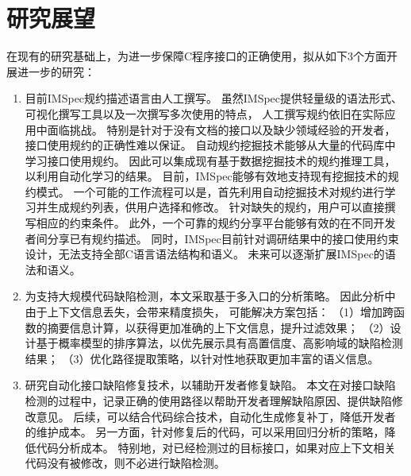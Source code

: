 \section{研究展望}
\label{sec:5.2}
在现有的研究基础上，为进一步保障C程序接口的正确使用，拟从如下3个方面开展进一步的研究：
\begin{enumerate}
	\item 目前IMSpec规约描述语言由人工撰写。
	虽然IMSpec提供轻量级的语法形式、可视化撰写工具以及一次撰写多次使用的特点，
	人工撰写规约依旧在实际应用中面临挑战。
	特别是针对于没有文档的接口以及缺少领域经验的开发者，接口使用规约的正确性难以保证。
	自动规约挖掘技术能够从大量的代码库中学习接口使用规约。
	因此可以集成现有基于数据挖掘技术的规约推理工具，以利用自动化学习的结果。
	目前，IMSpec能够有效地支持现有挖掘技术的规约模式。
	一个可能的工作流程可以是，首先利用自动挖掘技术对规约进行学习并生成规约列表，供用户选择和修改。
	针对缺失的规约，用户可以直接撰写相应的约束条件。
	此外，一个可靠的规约分享平台能够有效的在不同开发者间分享已有规约描述。
	同时，IMSpec目前针对调研结果中的接口使用约束设计，无法支持全部C语言语法结构和语义。
	未来可以逐渐扩展IMSpec的语法和语义。
	
	\item 为支持大规模代码缺陷检测，本文采取基于多入口的分析策略。
	因此分析中由于上下文信息丢失，会带来精度损失，
	可能解决方案包括：
	（1）增加跨函数的摘要信息计算，以获得更加准确的上下文信息，提升过滤效果；
	（2）设计基于概率模型的排序算法，以优先展示具有高置信度、高影响域的缺陷检测结果；
	（3）优化路径提取策略，以针对性地获取更加丰富的语义信息。
	
	
	\item 研究自动化接口缺陷修复技术，以辅助开发者修复缺陷。
	本文在对接口缺陷检测的过程中，记录正确的使用路径以帮助开发者理解缺陷原因、提供缺陷修改意见。
	后续，可以结合代码综合技术，自动化生成修复补丁，降低开发者的维护成本。
	另一方面，针对修复后的代码，可以采用回归分析的策略，降低代码分析成本。
	特别地，对已经检测过的目标接口，如果对应上下文相关代码没有被修改，则不必进行缺陷检测。
\end{enumerate}
